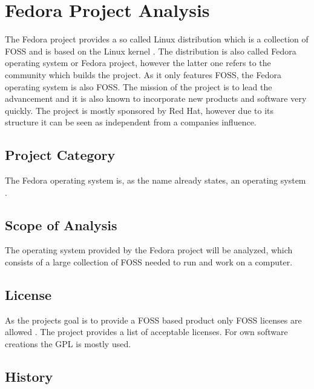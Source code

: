 
\section{Fedora Project Analysis} %


\noindent The Fedora project provides a so called Linux distribution which is a
collection of \ac{FOSS} and is based on the Linux kernel
\cite{FedoraAbout,FedoraTogami}. The distribution is also called Fedora
operating system or Fedora project, however the latter one refers to the
community which builds the project. As it only features \ac{FOSS}, the Fedora
operating system is also \ac{FOSS}. The mission of the project is to lead the
advancement and it is also known to incorporate new products and software very
quickly. The project is mostly sponsored by Red Hat, however due to its
structure it can be seen as independent from a companies influence.

\subsection{Project Category}

The Fedora operating system is, as the name already states, an operating system
\cite{FedoraAbout}.

\subsection{Scope of Analysis}

The operating system provided by the Fedora project will be analyzed, which
consists of a large collection of \ac{FOSS} needed to run and work on a
computer.

\subsection{License}

As the projects goal is to provide a \ac{FOSS} based product only \ac{FOSS}
licenses are allowed \cite{FedoraLicensing}. The project provides a list of
acceptable licenses. For own software creations the \ac{GPL} is mostly used.

\subsection{History}

